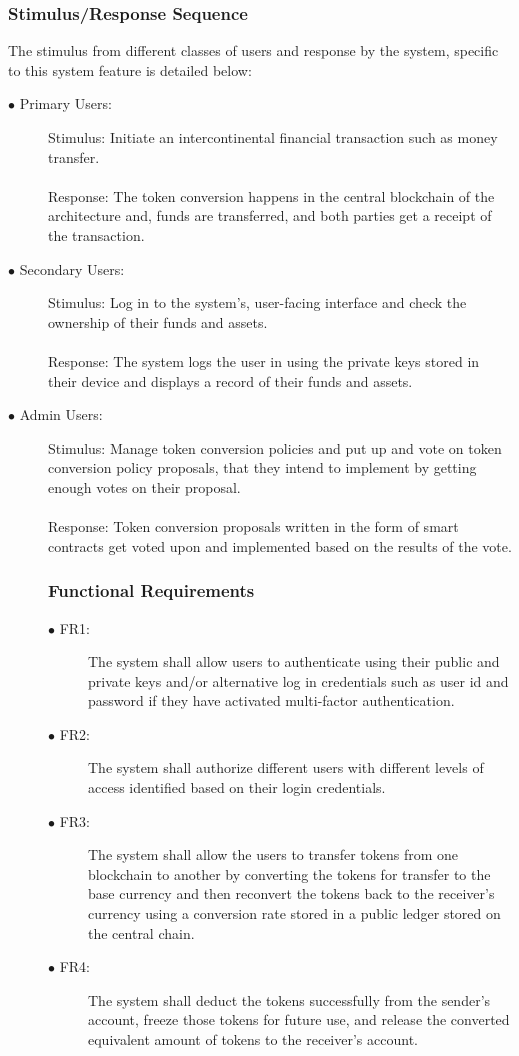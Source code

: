 \documentclass[a4paper,twoside,phd]{BYUPhys}
\begin{document}
\subsubsection{Stimulus/Response Sequence}
The stimulus from different classes of users and response by the system, specific to this system feature is detailed below:
\begin{description}
\item[$\bullet$ Primary Users:] Stimulus: Initiate an intercontinental financial transaction such as money transfer.
\\
\\
Response: The token conversion happens in the central blockchain of the architecture and, funds are transferred, and both parties get a receipt of the transaction.
\item[$\bullet$ Secondary Users:]
Stimulus: Log in to the system's, user-facing interface and check the ownership of their funds and assets.
\\
\\
Response: The system logs the user in using the private keys stored in their device and displays a record of their funds and assets.
\item[$\bullet$ Admin Users:] Stimulus: Manage token conversion policies and put up and vote on token conversion policy proposals, that they intend to implement by getting enough votes on their proposal.
\\
\\
Response: Token conversion proposals written in the form of smart contracts get voted upon and implemented based on the results of the vote.
\subsubsection{Functional Requirements}
\begin{description}
\item[$\bullet$ FR1:] The system shall allow users to authenticate using their public and private keys and/or alternative log in credentials such as user id and password if they have activated multi-factor authentication.
\item[$\bullet$ FR2:] The system shall authorize different users with different levels of access identified based on their login credentials.
\item[$\bullet$ FR3:] The system shall allow the users to transfer tokens from one blockchain to another by converting the tokens for transfer to the base currency and then reconvert the tokens back to the receiver's currency using a conversion rate stored in a public ledger stored on the central chain.
\item[$\bullet$ FR4:] The system shall deduct the tokens successfully from the sender's account, freeze those tokens for future use, and release the converted equivalent amount of tokens to the receiver's account.
\end{description}
\end{description}
\end{document}
